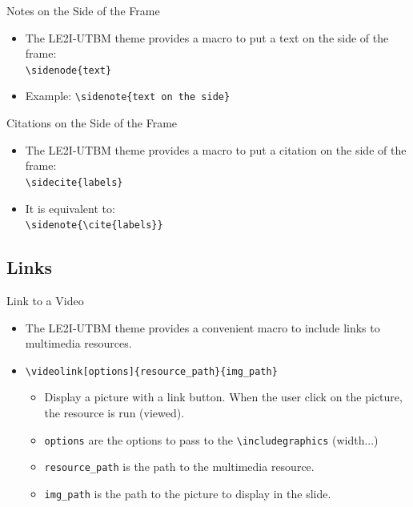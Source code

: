 \documentclass[english,sectioncirclenumberstyle]{le2iutbmbeamer}
\begin{document}
\begin{frame}{Notes on the Side of the Frame}
	\begin{itemize}
	\item The LE2I-UTBM theme provides a macro to put a text on the side of the frame: \\
		\texttt{{\textbackslash}sidenode\{text\}}
	\vspace{1em}
	\item Example: \texttt{{\textbackslash}sidenote\{text on the side\}}
	\end{itemize}
\end{frame}

\begin{frame}{Citations on the Side of the Frame}
	\begin{itemize}
	\item The LE2I-UTBM theme provides a macro to put a citation on the side of the frame: \\
		\texttt{{\textbackslash}sidecite\{labels\}}
	\vspace{1em}
	\item It is equivalent to: \\
		\texttt{{\textbackslash}sidenote\{{\textbackslash}cite\{labels\}\}}
	\end{itemize}
\end{frame}

\subsection{Links}
\tableofcontentslide[sectionstyle={show/shaded},subsectionstyle={show/shaded/hide},subsubsectionstyle={hide/hide/hide/hide},sections={3-}]

\begin{frame}[t]{Link to a Video}
	\begin{itemize}
	\item The LE2I-UTBM theme provides a convenient macro to include links to multimedia resources.
	\item \texttt{{\textbackslash}videolink[options]\{resource\_path\}\{img\_path\}}
		\begin{itemize}
		\item Display a picture with a link button. When the user click on the picture, the resource is run (viewed).
		\item \texttt{options} are the options to pass to the \texttt{{\textbackslash}includegraphics} (width...)
		\item \texttt{resource\_path} is the path to the multimedia resource.
		\item \texttt{img\_path} is the path to the picture to display in the slide.
		\end{itemize}
	\end{itemize}
	\begin{center}
	\end{center}
\end{frame}
\end{document}
